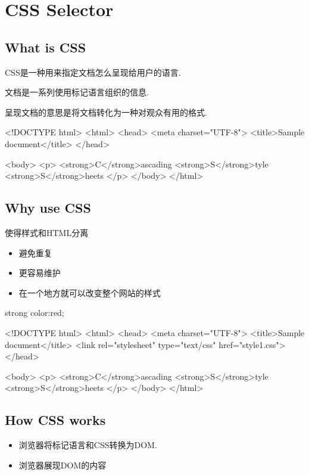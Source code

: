 \chapter{CSS Selector}

\section{What is CSS}

CSS是一种用来指定文档怎么呈现给用户的语言.

文档是一系列使用标记语言组织的信息.

呈现文档的意思是将文档转化为一种对观众有用的格式.

\begin{HTML5}[demo]
<!DOCTYPE html>
<html>
  <head>
  <meta charset="UTF-8">
  <title>Sample document</title>
  </head>

  <body>
    <p>
      <strong>C</strong>ascading
      <strong>S</strong>tyle
      <strong>S</strong>heets
    </p>
  </body>
</html>
\end{HTML5}

\section{Why use CSS}

使得样式和HTML分离
\begin{itemize}
\item 避免重复
\item 更容易维护
\item 在一个地方就可以改变整个网站的样式
\end{itemize}

\begin{CSS}
strong {color:red;}
\end{CSS}

\begin{HTML5}
<!DOCTYPE html>
<html>
  <head>
  <meta charset="UTF-8">
  <title>Sample document</title>
  <link rel="stylesheet" type="text/css" href="style1.css">
  </head>

  <body>
    <p>
      <strong>C</strong>ascading
      <strong>S</strong>tyle
      <strong>S</strong>heets
    </p>
  </body>
</html>
\end{HTML5}

\section{How CSS works}

\begin{itemize}
\item 浏览器将标记语言和CSS转换为DOM.
\item 浏览器展现DOM的内容
\end{itemize}

